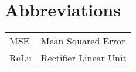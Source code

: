 \chapter{Abbreviations}

\begin{table}[H]
    \centering
    \renewcommand{\arraystretch}{2}
    \begin{tabular}{ll}
		MSE & Mean Squared Error \\
		ReLu & Rectifier Linear Unit 
    \end{tabular}
\end{table}

\makeatletter
{}
\makeatother